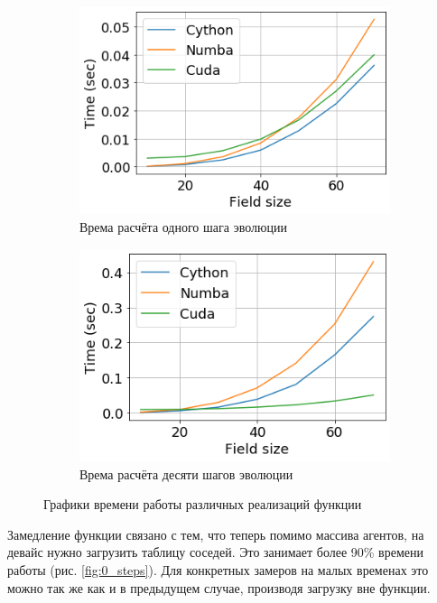 \documentclass[a4paper,12pt]{article}
\begin{document}
\begin{figure}[H]
	\centering
	\begin{subfigure}[b]{0.45\textwidth}
		\includegraphics[width = \textwidth]{Images/1_step_universal_cuda.png} 
		\caption{Врема расчёта одного шага эволюции} 
	\end{subfigure}
	\hfill
	\begin{subfigure}[b]{0.45\textwidth}
		\includegraphics[width = \textwidth]{Images/10_step_universal_cuda.png} 
		\caption{Врема расчёта десяти шагов эволюции} 
	\end{subfigure}
	\caption{Графики времени работы различных реализаций функции}
\end{figure}

Замедление функции связано с тем, что теперь помимо массива агентов, на девайс нужно загрузить таблицу соседей. Это занимает более 90\% времени работы (рис. \ref{fig:0_steps}). Для конкретных замеров на малых временах это можно так же как и в предыдущем случае, производя загрузку вне функции.
\end{document}
